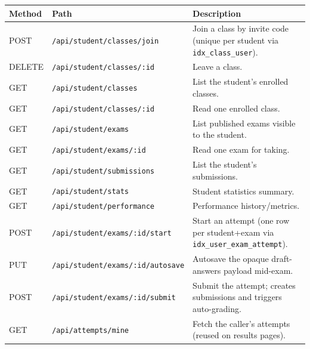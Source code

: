 \begin{xltabular}{\linewidth}{l >{\ttfamily\small\raggedright\arraybackslash}p{5.9cm} X}
  \toprule
  Method & Path & Description \\
  \midrule
  POST   & \texttt{/api/student/classes/join}      & Join a class by invite code (unique per student via \texttt{idx\_class\_user}). \\
  DELETE & \texttt{/api/student/classes/:id}        & Leave a class. \\
  GET    & \texttt{/api/student/classes}           & List the student's enrolled classes. \\
  GET    & \texttt{/api/student/classes/:id}        & Read one enrolled class. \\
  GET    & \texttt{/api/student/exams}             & List published exams visible to the student. \\
  GET    & \texttt{/api/student/exams/:id}          & Read one exam for taking. \\
  GET    & \texttt{/api/student/submissions}        & List the student's submissions. \\
  GET    & \texttt{/api/student/stats}              & Student statistics summary. \\
  GET    & \texttt{/api/student/performance}        & Performance history/metrics. \\
  POST   & \texttt{/api/student/exams/:id/start}    & Start an attempt (one row per student+exam via \texttt{idx\_user\_exam\_attempt}). \\
  PUT    & \texttt{/api/student/exams/:id/autosave} & Autosave the opaque draft-answers payload mid-exam. \\
  POST   & \texttt{/api/student/exams/:id/submit}   & Submit the attempt; creates submissions and triggers auto-grading. \\
  GET    & \texttt{/api/attempts/mine}              & Fetch the caller's attempts (reused on results pages). \\
  \bottomrule
\end{xltabular}
